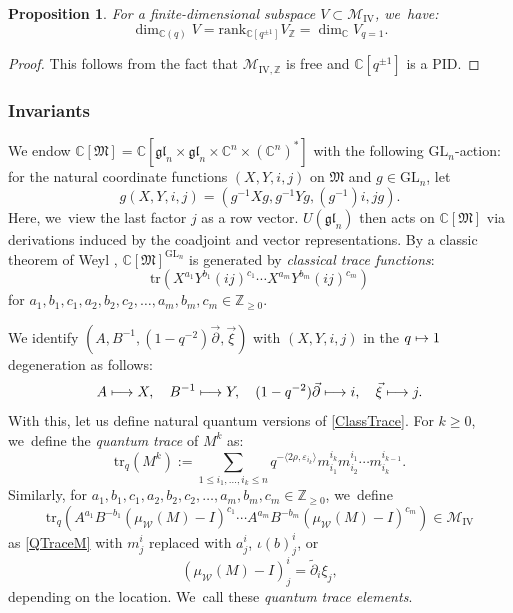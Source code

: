 \documentclass[JEP,XML,SOM,Unicode,published]{cedram}
\let\epsilon\varepsilon
\newcommand\mto{\mathchoice{\longmapsto}{\mapsto}{\mapsto}{\mapsto}}
\newcommand{\GL}{\mathrm{GL}}
\newtheorem{prop}[thm]{Proposition}
\theoremstyle{definition}
\newcommand{\ZZ}{\mathbb{Z}}
\newcommand{\CC}{\mathbb{C}}
\newcommand{\WW}{\mathcal{W}}
\newcommand{\MM}{\mathcal{M}}
\newcommand{\tr}{\mathrm{tr}}
\begin{document}
\begin{prop}\label{DimProp}
For a finite-dimensional subspace $V\subset\MM_{\mathrm{IV}}$, we~have:
\begin{equation}
\dim_{\CC(q)}V= \mathrm{rank}_{\CC[q^{\pm 1}]}V_\ZZ =\dim_{\CC}V_{q=1}.
\label{DimBound}
\end{equation}
\end{prop}

\begin{proof}
This follows from the fact that $\MM_{\mathrm{IV,\ZZ}}$ is free and $\CC[q^{\pm 1}]$ is a PID.
\end{proof}

\subsubsection{Invariants}
We endow $\CC[\mathfrak{M}]=\CC\left[\mathfrak{gl}_n\times\mathfrak{gl}_n\times\CC^n\times\left(\CC^n\right)^*\right]$ with the following $\GL_n$-action:
for the natural coordinate functions $(X,Y,i,j)$ on $\mathfrak{M}$ and $g\in \GL_n$, let
\[
g(X,Y,i,j)=(g^{-1}Xg, g^{-1}Yg, (g^{-1})i, jg).
\]
Here, we~view the last factor $j$ as a row vector.
$U(\mathfrak{gl}_n)$ then acts on $\CC[\mathfrak{M}]$ via derivations induced by the coadjoint and vector representations.
By a classic theorem of Weyl \cite{WeylInv}, $\CC[\mathfrak{M}]^{\GL_n}$ is generated by \textit{classical trace functions}:
\begin{equation}
\tr(X^{a_1}Y^{b_1}(i j)^{c_1}\cdots X^{a_m}Y^{b_m}(i j)^{c_m})
\label{ClassTrace}
\end{equation}
for $a_1,b_1,c_1, a_2,b_2, c_2,\ldots, a_m,b_m, c_m\in\ZZ_{\ge 0}$.

We identify $(A,B^{-1},(1-q^{-2})\vec{\partial},\vec{\xi})$ with $(X,Y,i,j)$ in the $q\mto 1$ degeneration as follows:
\begin{equation}
A\mto X,\quad B^{-1}\mto Y,\quad (1-q^{-2})\vec{\partial}\mto i,\quad \vec{\xi}\mto j.
\label{DegenTrans}
\end{equation}
With this, let us define natural quantum versions of \eqref{ClassTrace}.
For $k\ge 0$, we~define the \textit{quantum trace} of $M^k$ as:
\begin{equation}
\tr_q(M^k):=\sum_{1\le i_1,\ldots, i_k\le n} q^{-\langle 2\rho,\epsilon_{i_k}\rangle} m^{i_k}_{i_1}m^{i_1}_{i_2}\cdots m^{i_{k-1}}_{i_{k}}.
\label{QTraceM}
\end{equation}
Similarly, for $a_1,b_1,c_1, a_2,b_2, c_2,\ldots, a_m,b_m, c_m\in\ZZ_{\ge 0}$, we~define
\begin{equation}
\tr_q\left(A^{a_1}B^{-b_1}(\mu_{\WW}(M)-I)^{c_1}\cdots A^{a_m}B^{-b_m}(\mu_{\WW}(M)-I)^{c_m}\right)\in\MM_{\mathrm{IV}}
\label{QTrace}
\end{equation}
as \eqref{QTraceM} with $m_{j}^i$ replaced with $a^{i}_j$, $\iota(b)^{i}_j$, or
\[
\left(\mu_{\WW}(M)-I \right)^i_j=\widetilde{\partial}_i\xi_j,
\]
depending on the location. We~call these \textit{quantum trace elements}.
\end{document}
